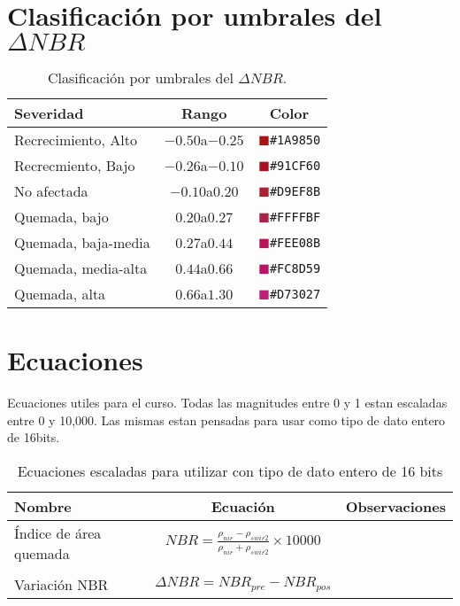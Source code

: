\documentclass[hidelinks,12pt]{article}
\begin{document}
\section{Clasificación por umbrales del $\Delta NBR$}\label{apcate}
\begin{table}[hbt]
    \centering
    \begin{tabular}{p{11cm}cc}
        \toprule
        Severidad & Rango & Color \\
        \midrule 
        Recrecimiento, Alto& $-0.50$a$-0.25$ &
        \textcolor{A11}{$\blacksquare$}\texttt{\#1A9850}\\
        Recrecmiento, Bajo & $-0.26$a$-0.10$ &
        \textcolor{A12}{$\blacksquare$}\texttt{\#91CF60}\\
        No afectada & $-0.10$a$0.20$
        &\textcolor{A23}{$\blacksquare$}\texttt{\#D9EF8B}\\
        Quemada, bajo & $0.20$a$0.27$
        &\textcolor{A24}{$\blacksquare$}\texttt{\#FFFFBF}\\
        Quemada, baja-media & $0.27$a$0.44$
        &\textcolor{B15}{$\blacksquare$}\texttt{\#FEE08B}\\
        Quemada, media-alta & $0.44$a$0.66$
        &\textcolor{B16}{$\blacksquare$}\texttt{\#FC8D59}\\
        Quemada, alta& $0.66$a$1.30$
        &\textcolor{B27}{$\blacksquare$}\texttt{\#D73027}\\
        \bottomrule
    \end{tabular}
\caption{\label{tabla1}Clasificación por umbrales del $\Delta NBR$.}
\end{table}

\section{Ecuaciones}
Ecuaciones utiles para el curso. Todas las magnitudes entre 0 y 1 estan
escaladas entre 0 y 10,000. Las mismas estan pensadas para usar como tipo de
dato entero de 16bits.

\begin{table}[hbt]
    \centering
    \begin{tabular}{lcl}
        \toprule
        Nombre & Ecuaci\'on & Observaciones\\
        \midrule
        Índice de área quemada & $NBR = \frac{\rho_{nir} -
    \rho_{swir2}}{\rho_{nir}+\rho_{swir2}}\times10000$ & \\
        & &\\
         Variación NBR& $\Delta NBR = NBR_{pre} - NBR_{pos}$ & \\
        \bottomrule
    \end{tabular}
    \caption{Ecuaciones escaladas para utilizar con tipo de dato entero de 16
    bits}
\end{table}

\end{document}
